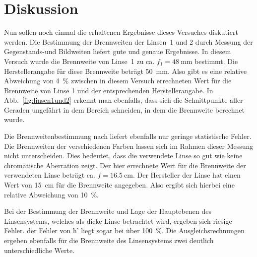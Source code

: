 
\section{Diskussion}
Nun sollen noch einmal die erhaltenen Ergebnisse dieses Versuches
diskutiert werden.  Die Bestimmung der Brennweiten der Linsen~1 und 2
durch Messung der Gegenstands-und Bildweiten liefert gute und genaue
Ergebnisse. In diesem Versuch wurde die Brennweite von Linse~1 zu
ca. $f_1 = \SI{48}{\milli\metre}$ bestimmt. Die Herstellerangabe für
diese Brennweite beträgt \SI{50}{\milli\metre}. Also gibt es eine
relative Abweichung von \SI{4}{\percent} zwischen in diesem Versuch
errechneten Wert für die Brennweite von Linse 1 und der entsprechenden
Herstellerangabe. In Abb.~\ref{fig:linsen1und2} erkennt man ebenfalls,
dass sich die Schnittpunkte aller Geraden ungefährt in dem Bereich
schneiden, in dem die Brennweite berechnet wurde.

Die Brennweitenbestimmung nach  liefert ebenfalls nur
geringe statistische Fehler. Die Brennweiten der verschiedenen Farben
lassen sich im Rahmen dieser Messung nicht unterscheiden. Dies bedeutet,
dass die verwendete Linse so gut wie keine chromatische Aberration
zeigt. Der hier errechnete Wert für die Brennweite der verwendeten Linse
beträgt ca. $f = \SI{16.5}{\centi\metre}$. Der Hersteller der Linse hat
einen Wert von \SI{15}{\centi\metre} für die Brennweite angegeben. Also
ergibt sich hierbei eine relative Abweichung von \SI{10}{\percent}.

Bei der Bestimmung der Brennweite und Lage der Hauptebenen des
Linsensystems, welches als dicke Linse betrachtet wird, ergeben sich
riesige Fehler. der Fehler von h' liegt sogar bei über
\SI{100}{\percent}. Die Ausgleichsrechnungen ergeben ebenfalls für die
Brennweite des Linsensystems zwei deutlich unterschiedliche Werte.

